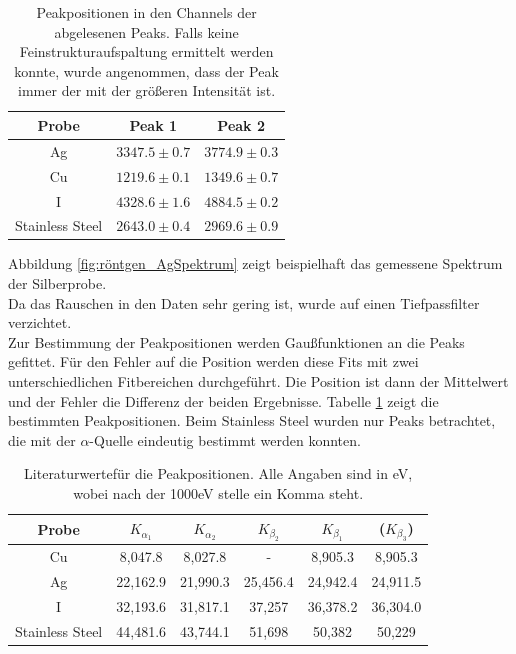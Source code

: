 \documentclass[12pt,a4paper]{article}
\begin{document}
\begin{table}
\centering
\begin{tabular}{|c|c|c|}
\hline 
Probe & Peak 1 & Peak 2 \\ 
\hline 
Ag & $3347.5\pm0.7$ & $3774.9\pm0.3$ \\ 
\hline 
Cu & $1219.6\pm0.1$ & $1349.6\pm0.7$ \\ 
\hline 
I & $4328.6\pm1.6$ & $4884.5\pm0.2$ \\ 
\hline 
Stainless Steel & $2643.0\pm0.4$ & $2969.6\pm0.9$ \\ 
\hline 
\end{tabular} 
\caption{Peakpositionen in den Channels der abgelesenen Peaks. Falls keine Feinstrukturaufspaltung ermittelt werden konnte, wurde angenommen, dass der Peak immer der mit der größeren Intensität ist.}
\label{tab:röntgen_kal}
\end{table}

Abbildung \ref{fig:röntgen_AgSpektrum} zeigt beispielhaft das gemessene Spektrum der Silberprobe. \\
Da das Rauschen in den Daten sehr gering ist, wurde auf einen Tiefpassfilter verzichtet. \\
Zur Bestimmung der Peakpositionen werden Gaußfunktionen an die Peaks gefittet. Für den Fehler auf die Position werden diese Fits mit zwei unterschiedlichen Fitbereichen durchgeführt. Die Position ist dann der Mittelwert und der Fehler die Differenz der beiden Ergebnisse. Tabelle \ref{tab:röntgen_kal} zeigt die bestimmten Peakpositionen. Beim Stainless Steel wurden nur Peaks betrachtet, die mit der $\alpha$-Quelle eindeutig bestimmt werden konnten.

\begin{table}
\centering
\begin{tabular}{|c|c|c|c|c|c|}
\hline 
Probe & $K_{\alpha_1}$ & $K_{\alpha_2}$ & $K_{\beta_2}$ & $K_{\beta_{1}}$ & ($K_{\beta_{3}}$) \\ 
\hline 
Cu & 8,047.8 & 8,027.8 & - & 8,905.3 & 8,905.3\\ 
\hline
Ag & 22,162.9 & 21,990.3 & 25,456.4 & 24,942.4 & 24,911.5\\ 
\hline 
I & 32,193.6 & 31,817.1 & 37,257 & 36,378.2 & 36,304.0\\ 
\hline 
Stainless Steel & 44,481.6 & 43,744.1 & 51,698 & 50,382 & 50,229\\ 
\hline 
\end{tabular} 
\caption[test]{Literaturwerte\footnotemark für die Peakpositionen. Alle Angaben sind in eV, wobei nach der 1000eV stelle ein Komma steht.}
\label{tab:röntgen_lit}
\end{table}
\end{document}
